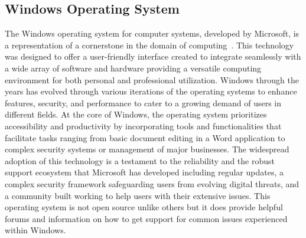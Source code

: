 \documentclass[manuscript,acmsmall,anonymous,review,screen,nonacm=true, authorversion=true]{acmart}
\begin{document}
\subsection{Windows Operating System}
The Windows operating system for computer systems, developed by Microsoft, is a
representation of a cornerstone in the domain of computing~\cite{gcfglobal,Webopedia}. This technology was designed
to offer a user-friendly interface created to integrate seamlessly with a wide array of software
and hardware providing a versatile computing environment for both personal and professional
utilization. Windows through the years has evolved through various iterations of the
operating systems to enhance features, security, and performance to cater to a growing demand
of users in different fields. At the core of Windows, the operating system prioritizes
accessibility and productivity by incorporating tools and functionalities that facilitate tasks
ranging from basic document editing in a Word application to complex security systems or
management of major businesses. The widespread adoption of this technology is a
testament to the reliability and the robust support ecosystem that Microsoft has developed
including regular updates, a complex security framework safeguarding users from evolving
digital threats, and a community built working to help users with their extensive issues.
This operating system is not open source unlike others but it does provide helpful forums and
information on how to get support for common issues experienced within Windows.
\end{document}
